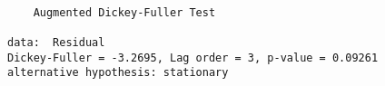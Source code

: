 \begin{verbatim} 

	Augmented Dickey-Fuller Test

data:  Residual
Dickey-Fuller = -3.2695, Lag order = 3, p-value = 0.09261
alternative hypothesis: stationary

\end{verbatim}
